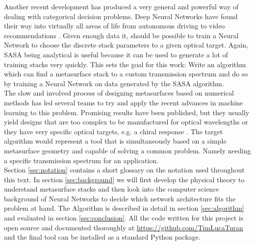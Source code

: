 \indent
Another recent development has produced a very general and powerful way of dealing with categorical decision problems. Deep Neural Networks have found their way into virtually all areas of life from autonomous driving \cite{Dequaire2016} to video recommendations \cite{youtube}. Given enough data it, should be possible to train a Neural Network to choose the discrete stack parameters to a given optical target.
Again, SASA being analytical is useful because it can be used to generate a lot of training stacks very quickly.
This sets the goal for this work: Write an algorithm which can find a metasurface stack to a custom transmission spectrum and do so by training a Neural Network on data generated by the SASA algorithm.
\\

\indent
The slow and involved process of designing metasurfaces based on numerical methods has led several teams to try and apply the recent advances in machine learning to this problem. Promising results have been published, but they usually yield designs that are too complex to be manufactured for optical wavelengths \cite{Fan2019} or they have very specific optical targets, e.g. a chiral response \cite{Ma2018}. The target algorithm would represent a tool that is simultaneously based on a simple metasurface geometry and capable of solving a common problem. Namely needing a specific transmission spectrum for an application.
\\

\indent
Section \ref{sec:notation} contains a short glossary on the notation used throughout this text.
In section \ref{sec:background} we will first develop the physical theory to understand metasurface stacks and then look into the computer science background of Neural Networks to decide which network architecture fits the problem at hand. 
The Algorithm is described in detail in section \ref{sec:algorithm} and evaluated in section \ref{sec:conclusion}.
All the code written for this project is open source and documented thoroughly at \url{https://github.com/TimLucaTuran} and the final tool can be installed as a standard Python package.
